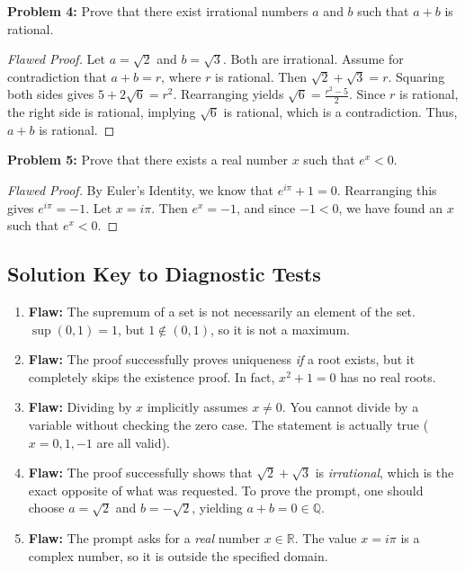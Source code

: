 \documentclass[11pt, a4paper]{article}
\theoremstyle{definition}
\theoremstyle{remark}
\newcommand{\R}{\mathbb{R}}
\newcommand{\Q}{\mathbb{Q}}
\begin{document}
\textbf{Problem 4:} Prove that there exist irrational numbers $a$ and $b$ such that $a+b$ is rational.
\begin{proof}[Flawed Proof]
    Let $a = \sqrt{2}$ and $b = \sqrt{3}$. Both are irrational. Assume for contradiction that $a+b = r$, where $r$ is rational. Then $\sqrt{2} + \sqrt{3} = r$. Squaring both sides gives $5 + 2\sqrt{6} = r^2$. Rearranging yields $\sqrt{6} = \frac{r^2 - 5}{2}$. Since $r$ is rational, the right side is rational, implying $\sqrt{6}$ is rational, which is a contradiction. Thus, $a+b$ is rational.
\end{proof}

\textbf{Problem 5:} Prove that there exists a real number $x$ such that $e^x < 0$.
\begin{proof}[Flawed Proof]
    By Euler's Identity, we know that $e^{i\pi} + 1 = 0$. Rearranging this gives $e^{i\pi} = -1$. Let $x = i\pi$. Then $e^x = -1$, and since $-1 < 0$, we have found an $x$ such that $e^x < 0$.
\end{proof}

\hrulefill

\subsection*{Solution Key to Diagnostic Tests}
\begin{enumerate}
    \item \textbf{Flaw:} The supremum of a set is not necessarily an element of the set. $\sup(0, 1) = 1$, but $1 \notin (0, 1)$, so it is not a maximum.
    \item \textbf{Flaw:} The proof successfully proves uniqueness \textit{if} a root exists, but it completely skips the existence proof. In fact, $x^2+1=0$ has no real roots.
    \item \textbf{Flaw:} Dividing by $x$ implicitly assumes $x \neq 0$. You cannot divide by a variable without checking the zero case. The statement is actually true ($x=0, 1, -1$ are all valid).
    \item \textbf{Flaw:} The proof successfully shows that $\sqrt{2}+\sqrt{3}$ is \textit{irrational}, which is the exact opposite of what was requested. To prove the prompt, one should choose $a = \sqrt{2}$ and $b = -\sqrt{2}$, yielding $a+b = 0 \in \Q$.
    \item \textbf{Flaw:} The prompt asks for a \textit{real} number $x \in \R$. The value $x = i\pi$ is a complex number, so it is outside the specified domain.
\end{enumerate}
\end{document}
